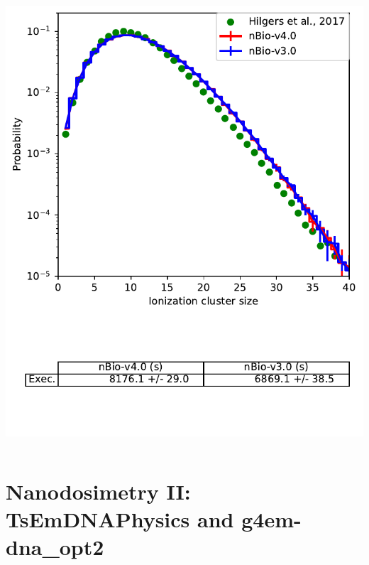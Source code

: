 \documentclass[aspectratio=1610]{beamer}
\begin{document}
\begin{frame}{\secname}
\begin{columns}
\begin{column}{0.4\linewidth}
     \includegraphics[width=\textwidth]{./NanodosimetryI/IDDistribution_opt6}
    \end{column}
   \end{columns}
\end{frame}

\section{Nanodosimetry II: TsEmDNAPhysics and g4em-dna\_opt2}
\end{document}
